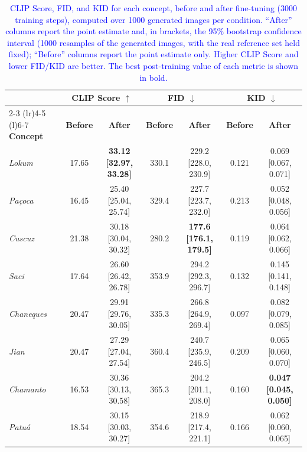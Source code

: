\documentclass[pdflatex,sn-mathphys-num]{sn-jnl}%
\theoremstyle{thmstyleone}%
\theoremstyle{thmstyletwo}%
\theoremstyle{thmstylethree}%
\begin{document}
\begin{table}[htbp]
    \centering
    \caption{\textcolor{blue}{CLIP Score, FID, and KID for each concept, before and after fine-tuning (3000 training steps), computed over 1000 generated images per condition. ``After'' columns report the point estimate and, in brackets, the 95\% bootstrap confidence interval (1000 resamples of the generated images, with the real reference set held fixed); ``Before'' columns report the point estimate only. Higher CLIP Score and lower FID/KID are better. The best post-training value of each metric is shown in bold.}}
    \label{tab:clip-fid-results}
    \fontsize{7}{8.5}\selectfont
    \setlength{\tabcolsep}{2pt}
    \begin{tabular}{@{}lcccccc@{}}
        \toprule
        & \multicolumn{2}{c}{\textbf{CLIP Score} $\uparrow$} & \multicolumn{2}{c}{\textbf{FID} $\downarrow$} & \multicolumn{2}{c}{\textbf{KID} $\downarrow$} \\
        \cmidrule(lr){2-3} \cmidrule(lr){4-5} \cmidrule(l){6-7}
        \textbf{Concept} & \textbf{Before} & \textbf{After} & \textbf{Before} & \textbf{After} & \textbf{Before} & \textbf{After} \\
        \midrule
        \textit{Lokum}      & 17.65 & \textbf{33.12 [32.97, 33.28]} & 330.1 & 229.2 [228.0, 230.9] & 0.121 & 0.069 [0.067, 0.071] \\
        \textit{Pa\c{c}oca} & 16.45 & 25.40 [25.04, 25.74] & 329.4 & 227.7 [223.7, 232.0] & 0.213 & 0.052 [0.048, 0.056] \\
        \textit{Cuscuz}     & 21.38 & 30.18 [30.04, 30.32] & 280.2 & \textbf{177.6 [176.1, 179.5]} & 0.119 & 0.064 [0.062, 0.066] \\
        \textit{Saci}       & 17.64 & 26.60 [26.42, 26.78] & 353.9 & 294.2 [292.3, 296.7] & 0.132 & 0.145 [0.141, 0.148] \\
        \textit{Chaneques}  & 20.47 & 29.91 [29.76, 30.05] & 335.3 & 266.8 [264.9, 269.4] & 0.097 & 0.082 [0.079, 0.085] \\
        \textit{Jian}       & 20.47 & 27.29 [27.04, 27.54] & 360.4 & 240.7 [235.9, 246.5] & 0.209 & 0.065 [0.060, 0.070] \\
        \textit{Chamanto}   & 16.53 & 30.36 [30.13, 30.58] & 365.3 & 204.2 [201.1, 208.0] & 0.160 & \textbf{0.047 [0.045, 0.050]} \\
        \textit{Patu\'a}    & 18.54 & 30.15 [30.03, 30.27] & 354.6 & 218.9 [217.4, 221.1] & 0.166 & 0.062 [0.060, 0.065] \\
        \bottomrule
    \end{tabular}
\end{table}
\end{document}
